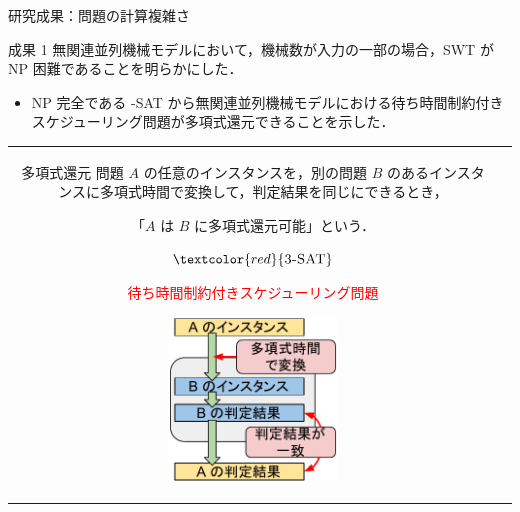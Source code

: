 \documentclass[dvipdfmx]{beamer}
\begin{document}
    \begin{frame}{研究成果：問題の計算複雑さ}
      \begin{alertblock}{成果 1}
        無関連並列機械モデルにおいて，機械数が入力の一部の場合，SWT が NP 困難であることを明らかにした．
        \begin{itemize}
          \item NP 完全である {-SAT} から無関連並列機械モデルにおける待ち時間制約付きスケジューリング問題が\alert{多項式還元}できることを示した．
        \end{itemize}
      \end{alertblock}
      \begin{tabular}{cc}
        \begin{minipage}[]{0.6\hsize}
          \begin{block}{多項式還元}
            問題 $A$ の任意のインスタンスを，別の問題 $B$ のあるインスタンスに多項式時間で変換して，判定結果を同じにできるとき，
            \begin{center}
              「$A$ は $B$ に多項式還元可能」という．
            \end{center}
            \begin{description}
              \setlength{\leftskip}{-12mm}
              \item[$A = $] ${\textcolor{red}{\mbox {\sc 3-SAT}}}$
              \item[$B = $] {\textcolor{red}{待ち時間制約付きスケジューリング問題}}
            \end{description}
          \end{block}
        \end{minipage}
        \begin{minipage}[]{0.4\hsize}
          \begin{figure}[h]
            \centering
            \includegraphics[width=4.5cm]{figure/reduction.pdf}
          \end{figure}
        \end{minipage}
        \vspace{5mm}
      \end{tabular}
    \end{frame}
\end{document}
